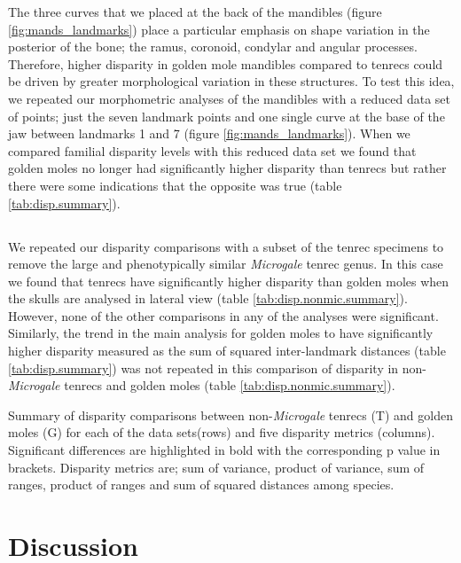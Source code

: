 	The three curves that we placed at the back of the mandibles (figure \ref{fig:mands_landmarks}) place a particular emphasis on shape variation in the posterior of the bone; the ramus, coronoid, condylar and angular processes. Therefore, higher disparity in golden mole mandibles compared to tenrecs could be driven by greater morphological variation in these structures. To test this idea, we repeated our morphometric analyses of the mandibles with a reduced data set of points; just the seven landmark points and one single curve at the base of the jaw between landmarks 1 and 7 (figure \ref{fig:mands_landmarks}). When we compared familial disparity levels with this reduced data set we found that golden moles no longer had significantly higher disparity than tenrecs but rather there were some indications that the opposite was true (table \ref{tab:disp.summary}).
	
\subsection{}
\label{sect:nonmic_gmoles} 	   
	
	We repeated our disparity comparisons with a subset of the tenrec specimens to remove the large and phenotypically similar \textit{Microgale} tenrec genus. In this case we found that tenrecs have significantly higher disparity than golden moles when the skulls are analysed in lateral view (table \ref{tab:disp.nonmic.summary}). However, none of the other comparisons in any of the analyses were significant. Similarly, the trend in the main analysis for golden moles to have significantly higher disparity measured as the sum of squared inter-landmark distances (table \ref{tab:disp.summary}) was not repeated in this comparison of disparity in non-\textit{Microgale} tenrecs and golden moles (table \ref{tab:disp.nonmic.summary}).
\bigskip
	\begin{table}[!htb]			
	\caption[Comparisons of disparity metrics for non-\textit{Microgale} tenrecs and golden moles]
		{Summary of disparity comparisons between non-\textit{Microgale} tenrecs (T) and golden moles (G) for each of the data sets(rows) and five disparity metrics (columns). Significant differences are highlighted in bold with the corresponding p value in brackets. Disparity metrics are; sum of variance, product of variance, sum of ranges, product of ranges and sum of squared distances among species. }
	\centering
	 
	\label{tab:disp.nonmic.summary}  
	\end{table}


\section{Discussion}





